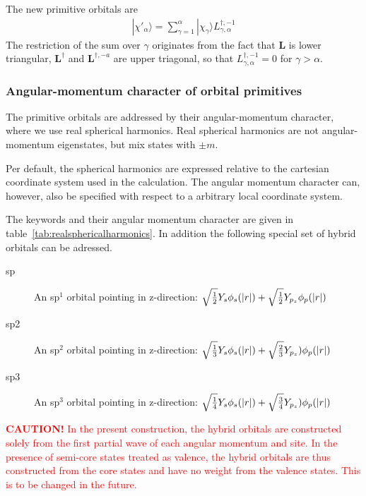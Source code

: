 \documentclass[final,12pt,makeidx,DIV=calc]{article}
\newcommand{\mat}[1]{\mathbf{#1}}
\begin{document}
{{{{{{The new primitive orbitals are
\begin{eqnarray}
|\chi'_\alpha\rangle=\sum_{\gamma=1}^{\alpha}
|\chi_\gamma\rangle L^{\dagger,-1}_{\gamma,\alpha}
\end{eqnarray}
The restriction of the sum over $\gamma$ originates from the fact that
$\mat{L}$ is lower triangular, $\mat{L}^\dagger$ and
$\mat{L}^{\dagger,-a}$ are upper triagonal, so that
$L^{\dagger,-1}_{\gamma,\alpha}=0$ for $\gamma>\alpha$.

\subsubsection{Angular-momentum character of orbital primitives}
\label{sec:dostoolorbitalprimitivesangularmomentum}
The primitive orbitals are addressed by their angular-momentum
character, where we use real spherical harmonics. Real spherical
harmonics are not angular-momentum eigenstates, but mix states with
$\pm m$. 

Per default, the spherical harmonics are expressed relative to the
cartesian coordinate system used in the calculation.  The angular
momentum character can, however, also be specified with respect to a
arbitrary local coordinate system.

The keywords and their angular momentum character are given in
table~\ref{tab:realsphericalharmonics}. In addition the following
special set of hybrid orbitals can be adressed.
\begin{description}
\item[sp] An sp$^1$ orbital pointing in z-direction: 
$\sqrt{1\over{2}}Y_s \phi_s(|r|) + \sqrt{1\over{2}}Y_{p_z}\phi_p(|r|)$
\item[sp2] An sp$^2$ orbital pointing in z-direction: 
$\sqrt{1\over{3}}Y_s\phi_s(|r|) + \sqrt{2\over{3}}Y_{p_z})\phi_p(|r|)$
\item[sp3] An sp$^3$ orbital pointing in z-direction: 
$\sqrt{1\over{4}}Y_s\phi_s(|r|) + \sqrt{3\over{4}}Y_{p_z})\phi_p(|r|)$
\end{description}

\textcolor{red}{\textbf{CAUTION!} In the present construction, the
  hybrid orbitals are constructed solely from the first partial wave
  of each angular momentum and site. In the presence of semi-core
  states treated as valence, the hybrid orbitals are thus constructed
  from the core states and have no weight from the valence
  states. This is to be changed in the future.}


}}}}}}
\end{document}
